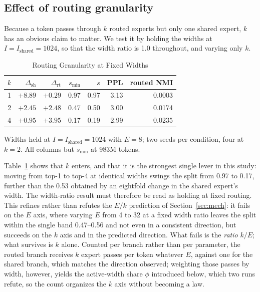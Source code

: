 \documentclass[conference,11pt]{IEEEtran}
\newcommand{\tabnote}[1]{\vspace{5pt}\parbox{\columnwidth}{\footnotesize #1}}
\begin{document}
\subsection{Effect of routing granularity}
\label{sec:topk}

Because a token passes through $k$ routed experts but only one shared expert, $k$ has an obvious
claim to matter. We test it by holding the widths at $I = I_{\mathrm{shared}} = 1024$, so that the
width ratio is 1.0 throughout, and varying only $k$.

\begin{table}[t]
\centering
\caption{Routing Granularity at Fixed Widths}
\label{tab:topk}
\vspace{4pt}
\footnotesize
\setlength{\tabcolsep}{3.5pt}
\begin{tabular}{rrrrrrr}
\toprule
$k$ & $\Delta_{\mathrm{sh}}$ & $\Delta_{\mathrm{rt}}$ & $s_{\min}$ & $s$ & PPL & routed NMI \\
\midrule
1 & $+8.89$ & $+0.29$ & 0.97 & 0.97 & 3.13 & 0.0003 \\
2 & $+2.45$ & $+2.48$ & 0.47 & 0.50 & 3.00 & 0.0174 \\
4 & $+0.95$ & $+3.95$ & 0.17 & 0.19 & 2.99 & 0.0235 \\
\bottomrule
\end{tabular}
\tabnote{Widths held at $I{=}I_{\mathrm{shared}}{=}1024$ with $E{=}8$; two seeds per
condition, four at $k{=}2$. All columns but $s_{\min}$ at 983M tokens.}
\end{table}

Table~\ref{tab:topk} shows that $k$ enters, and that it is the strongest single lever in this
study: moving from top-1 to top-4 at identical widths swings the split from 0.97 to 0.17, further
than the 0.53 obtained by an eightfold change in the shared expert's width. The width-ratio result must
therefore be read as holding at fixed routing. This refines rather than refutes the $E/k$
prediction of Section~\ref{sec:mech}: it fails on the $E$ axis, where varying $E$ from 4 to 32 at
a fixed width ratio leaves the split within the single band 0.47--0.56 and not even in a
consistent direction, but succeeds on the $k$ axis and in the predicted direction. What fails is
the \emph{ratio} $k/E$; what survives is $k$ alone. Counted per branch rather than per parameter,
the routed branch receives $k$ expert passes per token whatever $E$, against one for the shared
branch, which matches the direction observed; weighting those passes by width, however, yields the
active-width share $\phi$ introduced below, which two runs refute, so the count organizes the $k$
axis without becoming a law.
\end{document}
